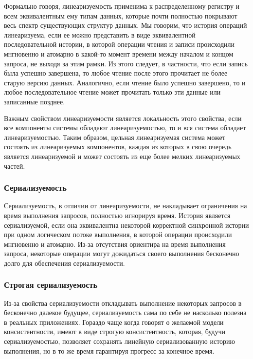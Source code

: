 Формально говоря, линеаризуемость применима к распределенному регистру и всем эквивалентным ему типам данных, которые почти полностью покрывают весь спектр существующих структур данных. Мы говорим, что история операций линеаризуема, если ее можно представить в виде эквивалентной последовательной истории, в которой операции чтения и записи происходили мнгновенно и атомарно в какой-то момент времени между началом и концом запроса, не выходя за этим рамки. Из этого следует, в частности, что если запись была успешно завершена, то любое чтение после этого прочитает не более старую версию данных. Аналогично, если чтение было успешно завершено, то и любое последовательное чтение может прочитать только эти данные или записанные позднее.

Важным свойством линеаризуемости является локальность этого свойства, если все компоненты системы обладают линеаризуемостью, то и вся система обладает линеаризуемостью. Таким образом, цельная линеаризуемая система может состоять из линеаризуемых компонентов, каждая из которых в свою очередь является линеаризуемой и может состоять из еще более мелких линеаризуемых частей.

\subsubsection{Сериализуемость}

Сериализуемость, в отличии от линеаризуемости, не накладывает ограничения на время выполнения запросов, полностью игнорируя время. История является сериализуемой, если она эквивалентна некоторой корректной синхронной истории при одном логическом потоке выполнения, в которой операции происходили мнгновенно и атомарно. Из-за отсутствия ориентира на время выполнения запроса, некоторые операции могут дожидаться своего выполнения бесконечно долго для обеспечения сериализуемости.

\subsubsection{Строгая сериализуемость}

Из-за свойства сериализуемости откладывать выполнение некоторых запросов в бесконечно далекое будущее, сериализуемость сама по себе не насколько полезна в реальных приложениях. Гораздо чаще когда говорят о желаемой модели консистентности, имеют в виде строгую консистентность, которая, будучи сериализуемостью, позволяет сохранять линейную сериализованную историю выполнения, но в то же время гарантируя прогресс за конечное время.

